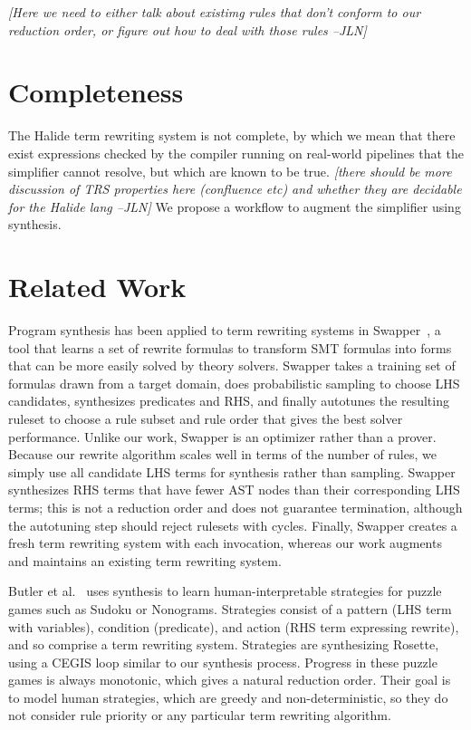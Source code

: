 \documentclass[sigplan,review,anonymous]{acmart}\settopmatter{printfolios=true,printccs=false,printacmref=false}
\newcommand{\jln}[1]{\textcolor{uwpurple}{\textit{[{#1} --JLN]}}}
\begin{document}
\jln{Here we need to either talk about existimg rules that don't conform to our reduction order, or figure out how to deal with those rules}



\section{Completeness}

The Halide term rewriting system is not complete, by which we mean that there exist expressions checked by the compiler running on real-world pipelines that the simplifier cannot resolve, but which are known to be true. \jln{there should be more discussion of TRS properties here (confluence etc) and whether they are decidable for the Halide lang} We propose a workflow to augment the simplifier using synthesis.

\section{Related Work}

Program synthesis has been applied to term rewriting systems in Swapper~\cite{singh2016swapper}, a tool that learns a set of rewrite formulas to transform SMT formulas into forms that can be more easily solved by theory solvers. Swapper takes a training set of formulas drawn from a target domain, does probabilistic sampling to choose LHS candidates, synthesizes predicates and RHS, and finally autotunes the resulting ruleset to choose a rule subset and rule order that gives the best solver performance. Unlike our work, Swapper is an optimizer rather than a prover. Because our rewrite algorithm scales well in terms of the number of rules, we simply use all candidate LHS terms for synthesis rather than sampling. Swapper synthesizes RHS terms that have fewer AST nodes than their corresponding LHS terms; this is not a reduction order and does not guarantee termination, although the autotuning step should reject rulesets with cycles. Finally, Swapper creates a fresh term rewriting system with each invocation, whereas our work augments and maintains an existing term rewriting system.

Butler et al.~\cite{butler2017synthesizing} uses synthesis to learn human-interpretable strategies for puzzle games such as Sudoku or Nonograms. Strategies consist of a pattern (LHS term with variables), condition (predicate), and action (RHS term expressing rewrite), and so comprise a term rewriting system. Strategies are synthesizing Rosette, using a CEGIS loop similar to our synthesis process. Progress in these puzzle games is always monotonic, which gives a natural reduction order. Their goal is to model human strategies, which are greedy and non-deterministic, so they do not consider rule priority or any particular term rewriting algorithm. 
\end{document}
